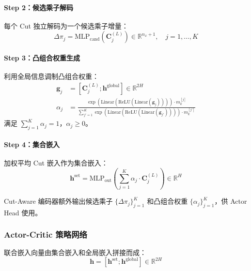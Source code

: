 \documentclass[11pt]{ctexart}
\begin{document}
\paragraph{Step 2：候选乘子解码}
每个 Cut 独立解码为一个候选乘子增量：
\begin{equation}
\Delta\pi_j = \mathrm{MLP}_{\text{cand}}\!\left(\mathbf{C}^{(L)}_j\right) \in \mathbb{R}^{n_x + 1}, \quad j = 1, \ldots, K
\end{equation}

\paragraph{Step 3：凸组合权重生成}
利用全局信息调制凸组合权重：
\begin{align}
\mathbf{g}_j &= \left[\mathbf{C}^{(L)}_j; \mathbf{h}^{\text{global}}\right] \in \mathbb{R}^{2H} \\
\alpha_j &= \frac{\exp\!\left(\mathrm{Linear}\!\left(\mathrm{ReLU}\!\left(\mathrm{Linear}\!\left(\mathbf{g}_j\right)\right)\right)\right) \cdot m_k^{[j]}}{\sum_{j'=1}^{K} \exp\!\left(\mathrm{Linear}\!\left(\mathrm{ReLU}\!\left(\mathrm{Linear}\!\left(\mathbf{g}_{j'}\right)\right)\right)\right) \cdot m_k^{[j']}}
\end{align}
满足 $\sum_{j=1}^{K} \alpha_j = 1$，$\alpha_j \ge 0$。

\paragraph{Step 4：集合嵌入}
加权平均 Cut 嵌入作为集合嵌入：
\begin{equation}
\mathbf{h}^{\text{set}} = \mathrm{MLP}_{\text{out}}\!\left(\sum_{j=1}^{K} \alpha_j \cdot \mathbf{C}^{(L)}_j\right) \in \mathbb{R}^{H}
\end{equation}

Cut-Aware 编码器额外输出候选乘子 $\{\Delta\pi_j\}_{j=1}^K$ 和凸组合权重 $\{\alpha_j\}_{j=1}^K$，供 Actor Head 使用。


\subsubsection{Actor-Critic 策略网络}

联合嵌入向量由集合嵌入和全局嵌入拼接而成：
\begin{equation}
\mathbf{h} = \left[\mathbf{h}^{\text{set}}; \mathbf{h}^{\text{global}}\right] \in \mathbb{R}^{2H}
\end{equation}
\end{document}
